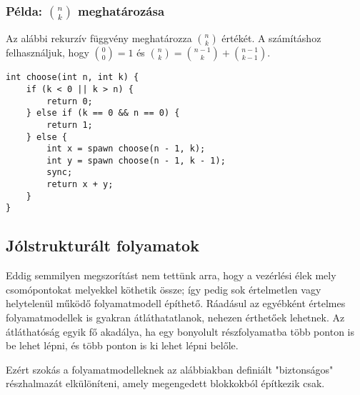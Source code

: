 \subsubsection{Példa: $n \choose k$ meghatározása}

Az alábbi rekurzív függvény meghatározza $n \choose k$ értékét. A számításhoz felhasználjuk, hogy ${0 \choose 0} = 1$ és ${n \choose k} = {n-1 \choose k} + {n-1 \choose k-1}$.


\begin{minipage}{\balhasab}
\begin{lstlisting}
int choose(int n, int k) {
	if (k < 0 || k > n) {
		return 0;
	} else if (k == 0 && n == 0) {
		return 1;
	} else {
		int x = spawn choose(n - 1, k);
		int y = spawn choose(n - 1, k - 1);
		sync;
		return x + y;
	}
}
\end{lstlisting}
\end{minipage}
\begin{minipage}{\jobbhasab}
\end{minipage}




\subsection{Jólstrukturált folyamatok}\label{sec:jolstrukturalt-folyamatok}

Eddig semmilyen megszorítást nem tettünk arra, hogy a vezérlési élek mely csomópontokat melyekkel köthetik össze; így pedig sok értelmetlen vagy helytelenül működő folyamatmodell építhető. Ráadásul az egyébként értelmes folyamatmodellek is gyakran átláthatatlanok, nehezen érthetőek lehetnek. Az átláthatóság egyik fő akadálya, ha egy bonyolult részfolyamatba több ponton is be lehet lépni, és több ponton is ki lehet lépni belőle.

Ezért szokás a folyamatmodelleknek az alábbiakban definiált "biztonságos" részhalmazát elkülöníteni, amely megengedett blokkokból építkezik csak.


